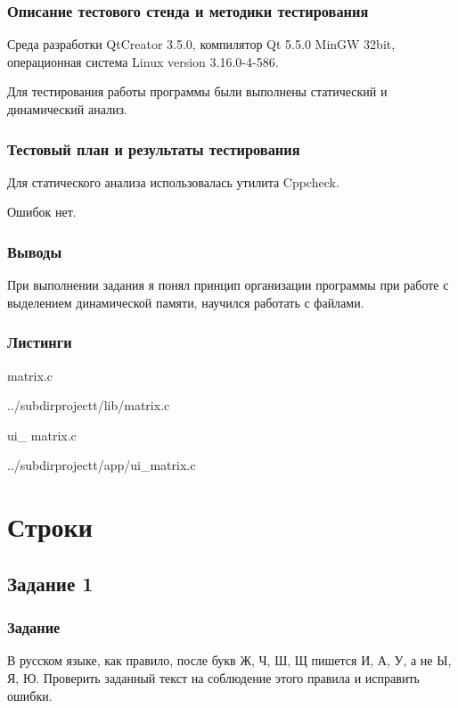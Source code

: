 \documentclass[12pt,a4paper]{report}
\begin{document}
\subsection{Описание тестового стенда и методики тестирования}
Среда разработки QtCreator 3.5.0, компилятор Qt 5.5.0 MinGW 32bit, операционная система Linux version 3.16.0-4-586.

Для тестирования работы программы были выполнены статический и динамический анализ.
\subsection{Тестовый план и результаты тестирования}

Для статического анализа использовалась утилита Cppcheck.

\vspace{\baselineskip}
Ошибок нет.

\subsection{Выводы}

При выполнении задания я понял принцип организации программы при работе с выделением динамической памяти, научился работать с файлами.

\subsection*{Листинги}

matrix.c

{../subdirprojectt/lib/matrix.c}

\vspace{\baselineskip}

ui\_ 
matrix.c

{../subdirprojectt/app/ui_matrix.c}

\chapter{Строки}
\section{Задание 1}
\subsection{Задание}

В русском языке, как правило, после букв Ж, Ч, Ш, Щ пишется И, А, У, а не Ы, Я, Ю. Проверить заданный текст на соблюдение этого правила и исправить ошибки.
\end{document}

